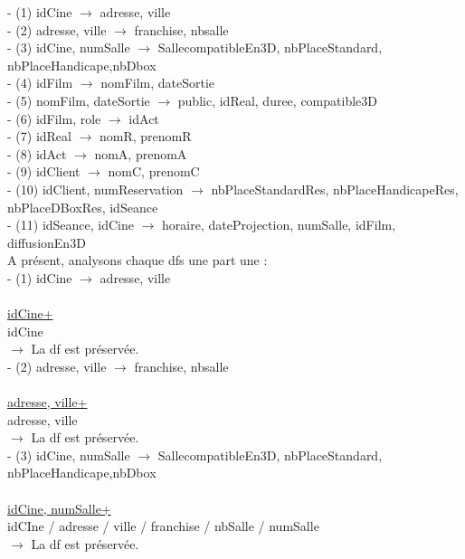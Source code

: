 \documentclass[a4paper,sffamily,12pt]{article}
\begin{document}
				\noindent- (1) idCine $\rightarrow$ adresse, ville \\
				- (2) adresse, ville $\rightarrow$ franchise, nbsalle \\
				- (3) idCine, numSalle $\rightarrow$ SallecompatibleEn3D, nbPlaceStandard, nbPlaceHandicape,nbDbox \\
		 		- (4) idFilm $\rightarrow$ nomFilm, dateSortie \\
				- (5) nomFilm, dateSortie $\rightarrow$ public, idReal, duree, compatible3D \\
				- (6) idFilm, role $\rightarrow$  idAct \\
				- (7) idReal $\rightarrow$ nomR, prenomR \\
				- (8) idAct $\rightarrow$ nomA, prenomA \\
				- (9) idClient $\rightarrow$ nomC, prenomC \\
				- (10) idClient, numReservation $\rightarrow$ nbPlaceStandardRes, nbPlaceHandicapeRes, nbPlaceDBoxRes, idSeance \\
				- (11) idSeance, idCine $\rightarrow$ horaire, dateProjection, numSalle, idFilm, diffusionEn3D \\
				
				\noindent A présent, analysons chaque dfs une part une : \\
				
				\noindent - (1) idCine $\rightarrow$ adresse, ville \\
					\\
					\underline{idCine+} \\
					idCine\\									
				$\rightarrow$ La df est préservée. \\		
					
				\noindent - (2) adresse, ville $\rightarrow$ franchise, nbsalle \\
					\\
					\underline{adresse, ville+} \\
					adresse, ville \\									
				$\rightarrow$ La df est préservée. \\
				
				\noindent - (3) idCine, numSalle $\rightarrow$ SallecompatibleEn3D, nbPlaceStandard, nbPlaceHandicape,nbDbox \\
					\\
					\underline{idCine, numSalle+} \\
					idCIne / adresse / ville / franchise / nbSalle / numSalle \\								
				$\rightarrow$ La df est préservée. \\													
\end{document}
